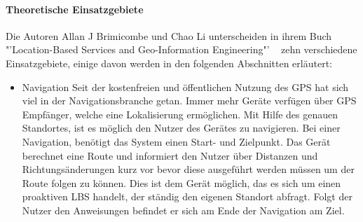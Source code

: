 \paragraph{Theoretische Einsatzgebiete}
Die Autoren Allan J Brimicombe und Chao Li unterscheiden in ihrem Buch "'Location-Based Services and Geo-Information Engineering"' ~\cite[S.132]{brimicombe_li:application_area} zehn verschiedene Einsatzgebiete, einige davon werden in den folgenden Abschnitten erläutert:
\begin{itemize}
	\item Navigation
Seit der kostenfreien und öffentlichen Nutzung des GPS hat sich viel in der Navigationsbranche getan. Immer mehr Geräte verfügen über GPS Empfänger, welche eine Lokalisierung ermöglichen. Mit Hilfe des genauen Standortes, ist es möglich den Nutzer des Gerätes zu navigieren. Bei einer Navigation, benötigt das System einen Start- und Zielpunkt. Das Gerät berechnet eine Route und informiert den Nutzer über Distanzen und Richtungsänderungen kurz vor bevor diese ausgeführt werden müssen um der Route folgen zu können. Dies ist dem Gerät möglich, das es sich um einen proaktiven LBS handelt, der ständig den eigenen Standort abfragt. Folgt der Nutzer den Anweisungen befindet er sich am Ende der Navigation am Ziel.


\end{itemize}
